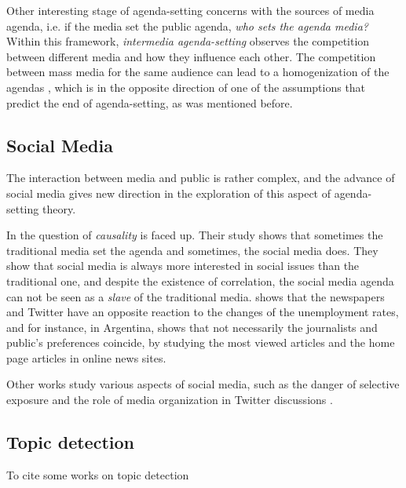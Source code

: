 \documentclass{bmcart}
\begin{document}
\par Other interesting stage of agenda-setting concerns with the sources of media agenda, i.e. if the media set the public agenda, \textit{who sets the agenda media?} 
Within this framework, \textit{intermedia agenda-setting} observes the competition between different media and how they influence each other.
The competition between mass media for the same audience can lead to a homogenization of the agendas \cite{vargo2017networks}, which is in the opposite direction of one of the assumptions that predict the end of agenda-setting, as was mentioned before.

\subsection*{Social Media}

\par The interaction between media and public is rather complex, and the advance of social media gives new direction in the exploration of this aspect of agenda-setting theory.
\par In \cite{russell2014dynamics} the question of \emph{causality} is faced up. Their study shows that sometimes the traditional media set the agenda and sometimes, the social media does. They show that social media is always more interested in social issues than the traditional one, and despite the existence of correlation, the social media agenda can not be seen as a \emph{slave} of the traditional media.
\cite{soroka2017negativity} shows that the newspapers and Twitter have an opposite reaction to the changes of the unemployment rates, and for instance, in Argentina, \cite{mitchelstein2016brecha} shows that not necessarily the journalists and public's preferences coincide, by studying the most viewed articles and the home page articles in online news sites.
\par Other works study various aspects of social media, such as the danger of selective exposure \cite{feezell2017agenda}\cite{messing2014selective}\cite{bakshy2015exposure} and the role of media organization in Twitter discussions \cite{calvo2016time}\cite{malik2016macroscopic}.

\subsection{Topic detection}

To cite some works on topic detection
\end{document}
